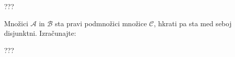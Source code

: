 \documentclass[addpoints,12pt]{exam}
\begin{document}
\begin{questions}

    \begin{solution}[10cm]
???
    \end{solution}


\newpage
    \question[5]
    Množici $\mathcal{A}$ in $\mathcal{B}$ sta pravi podmnožici množice $\mathcal{C}$, hkrati pa sta med seboj disjunktni. Izračunajte:


    \begin{solution}[1cm]
???
    \end{solution}





\end{questions}
\end{document}
